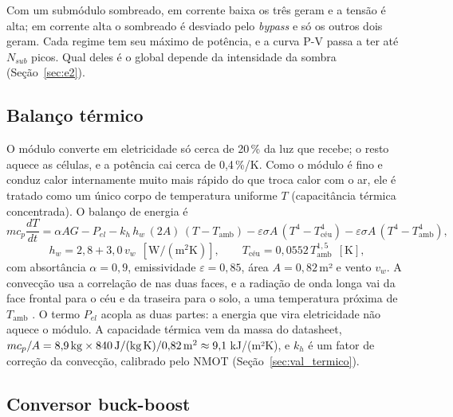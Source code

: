 \documentclass[3p,authoryear]{elsarticle}
\newcommand{\Tamb}{T_{\mathrm{amb}}}
\begin{document}
Com um submódulo sombreado, em corrente baixa os três geram e a tensão é alta; em corrente
alta o sombreado é desviado pelo \emph{bypass} e só os outros dois geram. Cada regime tem seu
máximo de potência, e a curva P-V passa a ter até $N_{sub}$ picos. Qual deles é o global
depende da intensidade da sombra (Seção~\ref{sec:e2}).

\subsection{Balanço térmico}

O módulo converte em eletricidade só cerca de 20\,\% da luz que recebe; o resto aquece as
células, e a potência cai cerca de 0,4\,\%/K. Como o módulo é fino e conduz calor
internamente muito mais rápido do que troca calor com o ar, ele é tratado como um único corpo
de temperatura uniforme $T$ (capacitância térmica concentrada). O balanço de energia é
\begin{equation}
m c_p \frac{dT}{dt} = \alpha A G - P_{el}
 - k_h\,h_w\,(2A)\,(T-\Tamb)
 - \varepsilon\sigma A\,(T^4 - T_{\text{céu}}^4)
 - \varepsilon\sigma A\,(T^4 - \Tamb^4),
\label{eq:termico}
\end{equation}
\begin{equation}
h_w = 2{,}8 + 3{,}0\,v_w \ \ [\mathrm{W/(m^2K)}], \qquad
T_{\text{céu}} = 0{,}0552\,\Tamb^{1{,}5} \ \ [\mathrm K],
\label{eq:correlacoes}
\end{equation}
com absortância $\alpha = 0{,}9$, emissividade $\varepsilon = 0{,}85$, área $A = 0{,}82$\,m²
e vento $v_w$. A convecção usa a correlação de \citet{watmuff} nas duas faces, e a radiação
de onda longa vai da face frontal para o céu \citep{swinbank} e da traseira para o solo, a
uma temperatura próxima de $\Tamb$ \citep{duffie}. O termo $P_{el}$ acopla as duas partes: a
energia que vira eletricidade não aquece o módulo. A capacidade térmica vem da massa do
datasheet, $m c_p / A = 8{,}9\,\text{kg}\times 840\,\text{J/(kg\,K)} / 0{,}82\,\text{m}^2
\approx 9{,}1$\,kJ/(m²K), e $k_h$ é um fator de correção da convecção, calibrado pelo NMOT
(Seção~\ref{sec:val_termico}).

\subsection{Conversor buck-boost}
\end{document}
